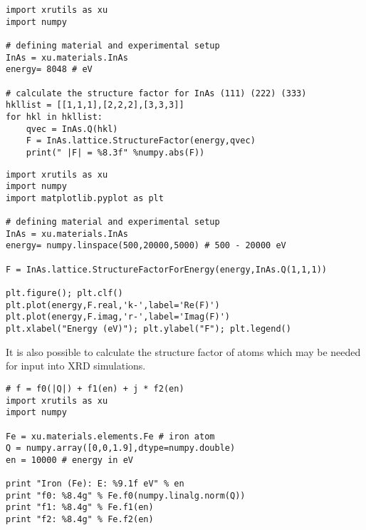 \begin{lstlisting}[caption=calculation of the reflection strength of a Bragg reflection]
import xrutils as xu
import numpy

# defining material and experimental setup
InAs = xu.materials.InAs
energy= 8048 # eV

# calculate the structure factor for InAs (111) (222) (333)
hkllist = [[1,1,1],[2,2,2],[3,3,3]]
for hkl in hkllist:
    qvec = InAs.Q(hkl)
    F = InAs.lattice.StructureFactor(energy,qvec)
    print(" |F| = %8.3f" %numpy.abs(F))
\end{lstlisting}

\begin{lstlisting}[caption=energy dependency of the structure factor]
import xrutils as xu
import numpy
import matplotlib.pyplot as plt

# defining material and experimental setup
InAs = xu.materials.InAs
energy= numpy.linspace(500,20000,5000) # 500 - 20000 eV

F = InAs.lattice.StructureFactorForEnergy(energy,InAs.Q(1,1,1))

plt.figure(); plt.clf()
plt.plot(energy,F.real,'k-',label='Re(F)')
plt.plot(energy,F.imag,'r-',label='Imag(F)')
plt.xlabel("Energy (eV)"); plt.ylabel("F"); plt.legend()
\end{lstlisting}

It is also possible to calculate the structure factor of atoms which may be needed for input into XRD simulations.

\begin{lstlisting}[caption=components of the structure factor for simulations]
# f = f0(|Q|) + f1(en) + j * f2(en)
import xrutils as xu
import numpy

Fe = xu.materials.elements.Fe # iron atom
Q = numpy.array([0,0,1.9],dtype=numpy.double)
en = 10000 # energy in eV

print "Iron (Fe): E: %9.1f eV" % en
print "f0: %8.4g" % Fe.f0(numpy.linalg.norm(Q))
print "f1: %8.4g" % Fe.f1(en)
print "f2: %8.4g" % Fe.f2(en)
\end{lstlisting}
